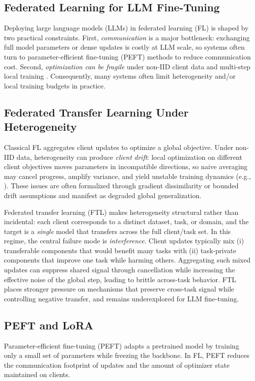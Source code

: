 \documentclass{article}
\theoremstyle{plain}
\theoremstyle{definition}
\theoremstyle{remark}
\begin{document}
\subsection{Federated Learning for LLM Fine-Tuning}
Deploying large language models (LLMs) in federated learning (FL) is shaped by two practical constraints. First, \emph{communication} is a major bottleneck: exchanging full model parameters or dense updates is costly at LLM scale, so systems often turn to parameter-efficient fine-tuning (PEFT) methods to reduce communication cost. Second, \emph{optimization can be fragile} under non-IID client data and multi-step local training \citet{mcmahan2017communication,reddi2020adaptive}. Consequently, many systems often limit heterogeneity and/or local training budgets in practice.

\subsection{Federated Transfer Learning Under Heterogeneity}
Classical FL aggregates client updates to optimize a global objective. Under non-IID data, heterogeneity can produce \emph{client drift}: local optimization on different client objectives moves parameters in incompatible directions, so naive averaging may cancel progress, amplify variance, and yield unstable training dynamics (e.g., \citet{mcmahan2017communication,stich2018local,karimireddy2020scaffold}). These issues are often formalized through gradient dissimilarity or bounded drift assumptions and manifest as degraded global generalization.

Federated transfer learning (FTL) makes heterogeneity structural rather than incidental: each client corresponds to a distinct dataset, task, or domain, and the target is a \emph{single} model that transfers across the full client/task set. In this regime, the central failure mode is \emph{interference}. Client updates typically mix (i) transferable components that would benefit many tasks with (ii) task-private components that improve one task while harming others. Aggregating such mixed updates can suppress shared signal through cancellation while increasing the effective noise of the global step, leading to brittle across-task behavior. FTL places stronger pressure on mechanisms that preserve cross-task signal while controlling negative transfer, and remains underexplored for LLM fine-tuning.

\subsection{PEFT and LoRA}
Parameter-efficient fine-tuning (PEFT) adapts a pretrained model by training only a small set of parameters while freezing the backbone. In FL, PEFT reduces the communication footprint of updates and the amount of optimizer state maintained on clients.
\end{document}
